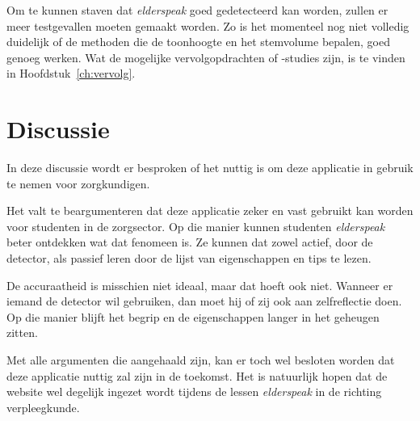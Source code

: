 Om te kunnen staven dat \textit{elderspeak} goed gedetecteerd kan worden, zullen er meer testgevallen moeten gemaakt worden. Zo is het momenteel nog niet volledig duidelijk of de methoden die de toonhoogte en het stemvolume bepalen, goed genoeg werken. Wat de mogelijke vervolgopdrachten of -studies zijn, is te vinden in Hoofdstuk~\ref{ch:vervolg}.

\section{Discussie}
In deze discussie wordt er besproken of het nuttig is om deze applicatie in gebruik te nemen voor zorgkundigen.

Het valt te beargumenteren dat deze applicatie zeker en vast gebruikt kan worden voor studenten in de zorgsector. Op die manier kunnen studenten \textit{elderspeak} beter ontdekken wat dat fenomeen is. Ze kunnen dat zowel actief, door de detector, als passief leren door de lijst van eigenschappen en tips te lezen.

De accuraatheid is misschien niet ideaal, maar dat hoeft ook niet. Wanneer er iemand de detector wil gebruiken, dan moet hij of zij ook aan zelfreflectie doen. Op die manier blijft het begrip en de eigenschappen langer in het geheugen zitten.

Met alle argumenten die aangehaald zijn, kan er toch wel besloten worden dat deze applicatie nuttig zal zijn in de toekomst. Het is natuurlijk hopen dat de website wel degelijk ingezet wordt tijdens de lessen \textit{elderspeak} in de richting verpleegkunde.